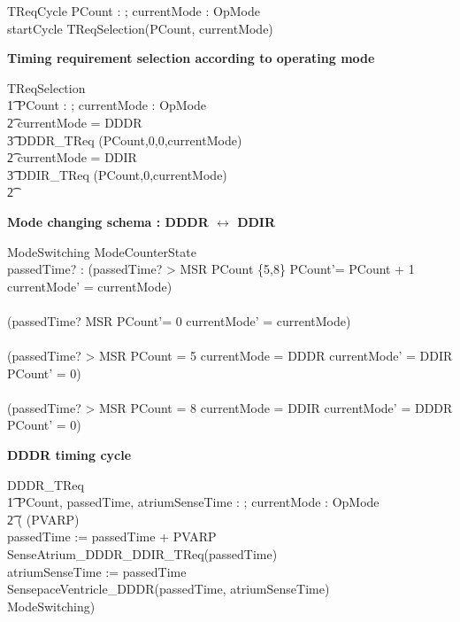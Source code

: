 \begin{circusaction}
	TReqCycle \circdef \circvres PCount : \nat ; \circvres currentMode : OpMode \circspot\\
	startCycle \then TReqSelection(PCount, currentMode)\\
\end{circusaction}


\textbf{ Timing requirement selection according to operating mode}\\
\begin{circusaction}
TReqSelection \circdef \\
\t1 \circvres PCount : \nat; \circvres currentMode : OpMode \circspot \\
\t2 \circif  currentMode = DDDR \circthen \\
\t3 DDDR\_TReq (PCount,0,0,currentMode) \\ 
\t2 \circelse currentMode = DDIR \circthen \\
\t3 DDIR\_TReq (PCount,0,currentMode)  \\ 
\t2 \circfi
\end{circusaction}




\textbf{Mode changing schema : DDDR $\leftrightarrow$ DDIR}

\begin{schema}{ModeSwitching}
 \Delta ModeCounterState\\
  passedTime? : \nat 
\where
(passedTime? > MSR \land PCount \notin \{5,8\} \land PCount'= PCount + 1 \land currentMode' = currentMode)\\
\lor \\
(passedTime? \leq MSR \land PCount'= 0 \land currentMode' = currentMode)\\
\lor \\
(passedTime? > MSR \land PCount = 5 \land currentMode = DDDR \land currentMode' = DDIR \land PCount' = 0) \\
\lor \\
(passedTime? > MSR \land PCount = 8 \land currentMode = DDIR \land currentMode' = DDDR \land PCount' = 0) \\
\end{schema}


\textbf{DDDR timing cycle}

\begin{circusaction}
DDDR\_TReq \circdef \\
\t1 \circvres PCount, passedTime, atriumSenseTime : \nat; \circvres currentMode : OpMode \\
  \t2 \circspot (
  \circwait(PVARP) \circseq \\
   passedTime := passedTime + PVARP \circseq \\
   SenseAtrium\_DDDR\_DDIR\_TReq(passedTime) \circseq \\
   atriumSenseTime := passedTime \circseq \\
   SensepaceVentricle\_DDDR(passedTime, atriumSenseTime) \circseq \\  
   ModeSwitching) \\ 
\end{circusaction}


